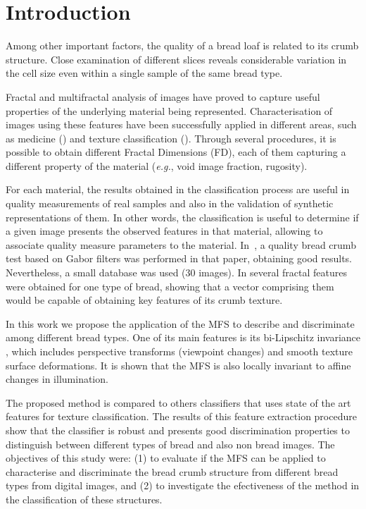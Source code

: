 \section{Introduction}
\label{intro}
Among other important factors, the quality of a bread loaf is related to its crumb structure. Close examination of different slices reveals considerable variation in the cell size even within a single sample of the same bread type. 

Fractal and multifractal analysis of images have proved to capture useful properties of the underlying material being represented. Characterisation of images using these features have been successfully applied in different areas, such as medicine (\cite{Andjelkovic2008,Yu2011}) and texture classification (\cite{Wendt2009}). Through several procedures, it is possible to obtain different Fractal Dimensions (FD), each of them capturing a different property of the material ({\em e.g.}, void image fraction, rugosity).

For each material, the results obtained in the classification process are useful in quality measurements of real samples and also in the validation of synthetic representations of them. In other words, the classification is useful to determine if a given image presents the observed features in that material, allowing to associate quality measure parameters to the material. In~\cite{Fan2006}, a quality bread crumb test based on Gabor filters was performed in that paper, obtaining good results. Nevertheless, a small database was used ($30$ images). In \cite{Gonzales2008} several fractal features were obtained for one type of bread, showing that a vector comprising them would be capable of obtaining key features of its crumb texture.

In this work we propose the application of the MFS \cite{XX} to describe and discriminate among different bread types. One of its main features is its bi-Lipschitz invariance \cite{bilipXXX}, which includes perspective transforms (viewpoint changes) and smooth texture surface deformations. It is shown that the MFS is also locally invariant to affine changes in illumination.

The proposed method is compared to others classifiers that uses state of the art features for texture classification. The results of this feature extraction procedure show that the classifier is robust and presents good discrimination properties to distinguish between different types of bread and also non bread images. The objectives of this study were: (1) to evaluate if the MFS can be applied to characterise and discriminate the bread crumb structure from different bread types from digital images, and (2) to investigate the efectiveness of the method in the classification of these structures.

